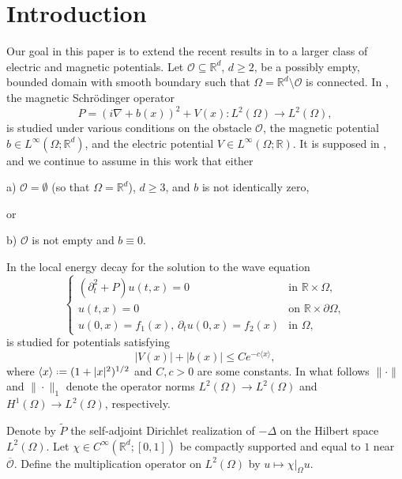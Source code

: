 \documentclass[11pt]{amsart}
\numberwithin{equation}{section}
\def\R{{\mathbb R}}
\def\cal{\mathcal}
\newcommand*{\defeq}{\mathrel{\vcenter{\baselineskip0.5ex \lineskiplimit0pt

                     \hbox{\scriptsize.}\hbox{\scriptsize.}}}%
                     =}
\begin{document}
\setcounter{section}{0}

\section{Introduction} \label{introduction section}
Our goal in this paper is to extend the recent results in \cite{kn:LSV} to a larger class of electric and magnetic potentials. 
Let $\cal{O}\subseteq\mathbb{R}^d$, $d\ge 2$, be a possibly empty, bounded domain with smooth boundary such that 
$\Omega=\mathbb{R}^d\setminus\cal{O}$ is connected. In \cite{kn:LSV}, the magnetic Schr\"odinger operator
\begin{equation} \label{eq:1.1}
P=(i\nabla+b(x))^2+V(x) : L^2(\Omega) \to L^2(\Omega),
\end{equation}
is studied under various conditions on the obstacle $\cal{O}$, the magnetic potential $b\in L^\infty(\Omega; \mathbb{R}^d)$, 
and the electric potential $V\in L^\infty(\Omega;\mathbb{R})$. It is supposed in \cite{kn:LSV}, and we continue to assume in this work that
 either

a) $\cal{O} = \emptyset$ (so that $\Omega = \R^d$), $d\ge 3$, and $b$ is not identically zero,

\noindent
or

b) $\cal{O}$ is not empty and $b\equiv 0$. 

In \cite{kn:LSV} the local energy decay for the solution to the wave equation
\begin{equation} \label{eq:1.2}
\begin{cases}
(\partial^2_t + P)u(t,x) = 0 & \text{in } \R \times \Omega, \\
u(t,x) = 0 & \text{on } \R \times \partial \Omega, \\
u(0,x) = f_1(x), \, \partial_tu(0,x) = f_2(x) & \text{in } \Omega,  
\end{cases}
\end{equation}
is studied for potentials satisfying
\begin{equation}\label{eq:1.3}
|V(x)|+|b(x)|\le Ce^{-c\langle x\rangle},
\end{equation}
where $\langle x \rangle \defeq (1 + |x|^2)^{1/2}$ and $C,c>0$ are some constants.
In what follows $\|\cdot\|$ and $\|\cdot\|_1$ denote the operator norms $L^2(\Omega)\to L^2(\Omega)$ and $H^1(\Omega)\to L^2(\Omega)$, respectively. 

Denote by $\widetilde{P}$ the self-adjoint Dirichlet realization of $-\Delta$ on the Hilbert space $L^2(\Omega)$. Let $\chi \in C^\infty(\mathbb{R}^d; [0,1])$ be compactly supported and equal to $1$ near $\overline{\mathcal{O}}$. Define the multiplication operator on $L^2(\Omega)$ by $u \mapsto \chi|_\Omega u$.
\end{document}
